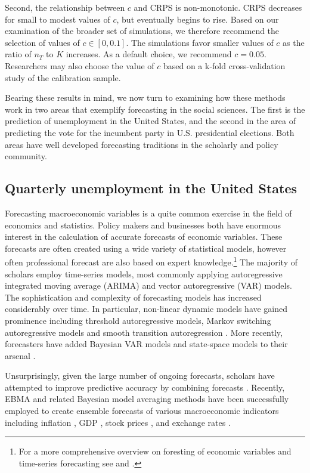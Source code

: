 \documentclass[12pt,fullpage,endnotes]{article}
\begin{document}
 Second, the relationship between $c$ and CRPS
is non-monotonic.  CRPS decreases for small to modest values of $c$,
but eventually begins to rise.  Based on our examination of the
broader set of simulations, we therefore recommend the selection of
values of $c \in [0, 0.1]$.  The simulations favor smaller values of
$c$ as the ratio of $n_T$ to $K$ increases.  As a default choice, we
recommend $c=0.05$.  Researchers may also choose the value of $c$
based on a k-fold cross-validation study of the calibration sample.

Bearing these results in mind, we now turn to examining how these
methods work in two areas that exemplify forecasting in the social
sciences. The first is the prediction of unemployment in the United
States, and the second in the area of predicting the vote for the
incumbent party in U.S. presidential elections. Both areas have well
developed forecasting traditions in the scholarly and policy
community.


\subsection{Quarterly unemployment in the United States}
\label{econ}

Forecasting macroeconomic variables is a quite common exercise in the
field of economics and statistics. Policy makers and businesses both
have enormous interest in the calculation of accurate forecasts of
economic variables. These forecasts are often created using a wide
variety of statistical models, however often professional forecast are
also based on expert knowledge.\footnote{For a more comprehensive
  overview on foresting of economic variables and time-series
  forecasting see \citet{Elliott:Timmermann:2008} and
  \citet{Goijer:Hyndman:2006}.}  The majority of scholars employ
time-series models, most commonly applying autoregressive integrated
moving average (ARIMA) and vector autoregressive (VAR) models. The
sophistication and complexity of forecasting models has increased
considerably over time. In particular, non-linear dynamic models have
gained prominence including threshold autoregressive models, Markov
switching autoregressive models and smooth transition autoregression
\citep{Elliott:Timmermann:2008,Montgomery:etal:1998}. More recently,
forecasters have added Bayesian VAR models and state-space models to
their arsenal \citep{Goijer:Hyndman:2006,Elliott:Timmermann:2008}.

Unsurprisingly, given the large number of ongoing forecasts, scholars
have attempted to improve predictive accuracy by combining forecasts
\citep{Bates:1969, Palm:Zellner:1992, Elliott:Timmermann:2008}.
Recently, EBMA and related Bayesian model averaging methods have been
successfully employed to create ensemble forecasts of various
macroeconomic indicators including inflation
\citep{Koop:2010,Wright:2009}, GDP \citep{Billio:2010}, stock prices
\citep{Billio:2011}, and exchange rates \citep{Wright:2008}.
\end{document}

